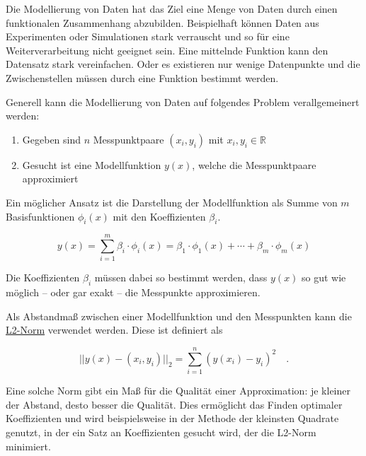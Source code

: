 \documentclass[
  letterpaper,
  DIV=11,
  numbers=noendperiod]{scrreprt}
\providecommand{\tightlist}{%
  \setlength{\itemsep}{0pt}\setlength{\parskip}{0pt}}\usepackage{longtable,booktabs,array}
\begin{document}
\begin{tcolorbox}[enhanced jigsaw, bottomtitle=1mm, colbacktitle=quarto-callout-note-color!10!white, colback=white, opacityback=0, arc=.35mm, left=2mm, toprule=.15mm, title=\textcolor{quarto-callout-note-color}{\faInfo}\hspace{0.5em}{Theorie - Modellierung}, coltitle=black, toptitle=1mm, leftrule=.75mm, opacitybacktitle=0.6, breakable, titlerule=0mm, rightrule=.15mm, bottomrule=.15mm, colframe=quarto-callout-note-color-frame]

Die Modellierung von Daten hat das Ziel eine Menge von Daten durch einen
funktionalen Zusammenhang abzubilden. Beispielhaft können Daten aus
Experimenten oder Simulationen stark verrauscht und so für eine
Weiterverarbeitung nicht geeignet sein. Eine mittelnde Funktion kann den
Datensatz stark vereinfachen. Oder es existieren nur wenige Datenpunkte
und die Zwischenstellen müssen durch eine Funktion bestimmt werden.

Generell kann die Modellierung von Daten auf folgendes Problem
verallgemeinert werden:

\begin{enumerate}
\def\labelenumi{\arabic{enumi}.}
\tightlist
\item
  Gegeben sind \(n\) Messpunktpaare \((x_i, y_i)\) mit
  \(x_i, y_i \in \mathbb{R}\)
\item
  Gesucht ist eine Modellfunktion \(y(x)\), welche die Messpunktpaare
  approximiert
\end{enumerate}

Ein möglicher Ansatz ist die Darstellung der Modellfunktion als Summe
von \(m\) Basisfunktionen \(\phi_i(x)\) mit den Koeffizienten
\(\beta_i\).

\[  y(x) = \sum_{i=1}^{m}\beta_i \cdot \phi_i(x) = \beta_1\cdot \phi_1(x) + \cdots + \beta_m\cdot \phi_m(x) \]

Die Koeffizienten \(\beta_i\) müssen dabei so bestimmt werden, dass
\(y(x)\) so gut wie möglich -- oder gar exakt -- die Messpunkte
approximieren.

Als Abstandmaß zwischen einer Modellfunktion und den Messpunkten kann
die \href{https://de.wikipedia.org/wiki/Folgenraum\#lp}{L2-Norm}
verwendet werden. Diese ist definiert als

\[  || y(x) - (x_i, y_i) ||_2 = \sum_{i=1}^n \left(y(x_i) - y_i\right)^2 \quad .\]

Eine solche Norm gibt ein Maß für die Qualität einer Approximation: je
kleiner der Abstand, desto besser die Qualität. Dies ermöglicht das
Finden optimaler Koeffizienten und wird beispielsweise in der Methode
der kleinsten Quadrate genutzt, in der ein Satz an Koeffizienten gesucht
wird, der die L2-Norm minimiert.

\end{tcolorbox}
\end{document}
